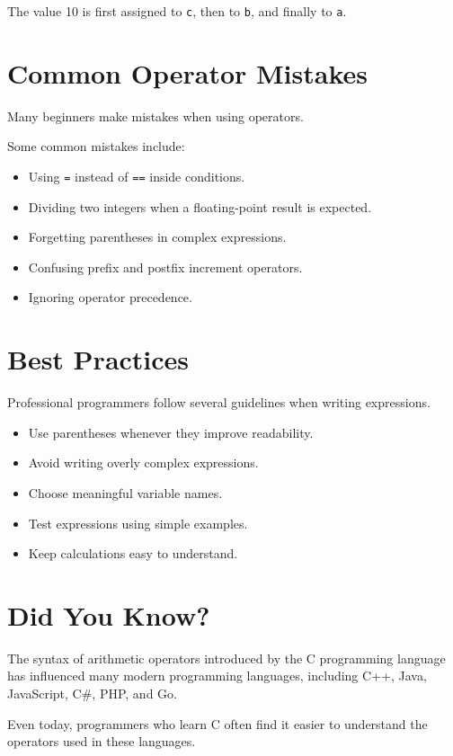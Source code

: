 \documentclass[12pt,openany]{book}
\begin{document}
The value 10 is first assigned to \texttt{c}, then to \texttt{b}, and finally to \texttt{a}.

\section{Common Operator Mistakes}

Many beginners make mistakes when using operators.

Some common mistakes include:

\begin{itemize}
    \item Using \texttt{=} instead of \texttt{==} inside conditions.
    \item Dividing two integers when a floating-point result is expected.
    \item Forgetting parentheses in complex expressions.
    \item Confusing prefix and postfix increment operators.
    \item Ignoring operator precedence.
\end{itemize}

\section{Best Practices}

Professional programmers follow several guidelines when writing expressions.

\begin{itemize}
    \item Use parentheses whenever they improve readability.
    \item Avoid writing overly complex expressions.
    \item Choose meaningful variable names.
    \item Test expressions using simple examples.
    \item Keep calculations easy to understand.
\end{itemize}

\section{Did You Know?}

The syntax of arithmetic operators introduced by the C programming language has influenced many modern programming languages, including C++, Java, JavaScript, C\#, PHP, and Go.

Even today, programmers who learn C often find it easier to understand the operators used in these languages.
\end{document}
